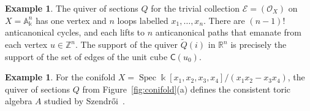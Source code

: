 \documentclass[11pt,a4paper]{amsart}
\numberwithin{equation}{section}
\theoremstyle{definition}
\newtheorem{example}[theorem]{Example}
\theoremstyle{remark}
\newcommand{\kk}{\ensuremath{\Bbbk}}
\newcommand{\RR}{\ensuremath{\mathbb{R}}}
\newcommand{\ZZ}{\ensuremath{\mathbb{Z}}}
\newcommand{\Spec}{\operatorname{Spec}}
\begin{document}
 \begin{example}
 \label{exa:trivialaction}
The quiver of sections $Q$ for the trivial collection $\mathscr{E}=(\mathcal{O}_X)$ on $X=\mathbb{A}^n_\kk$ has one vertex and $n$ loops labelled $x_1, \dots, x_n$. There are $(n-1)!$ anticanonical cycles, and each lifts to $n$ anticanonical paths that emanate from each vertex $u\in \ZZ^n$. The support of the quiver $\widetilde{Q}(i)$ in $\RR^n$ is precisely the support of the set of edges of the unit cube $\mathsf{C}(u_0)$.
\end{example}

\begin{example}
\label{exa:conifold}
For the conifold $X=\Spec \kk[x_1,x_2,x_3,x_4]/(x_1x_2-x_3x_4)$, the quiver of sections $Q$ from Figure~\ref{fig:conifold}(a) defines the consistent toric algebra $A$ studied by Szendr\H{o}i~\cite[Figure~1]{Szendroi}.
  \begin{figure}[!ht]
    \centering
      \quad\quad      \quad\quad
\end{figure}
\end{example}
\end{document}
